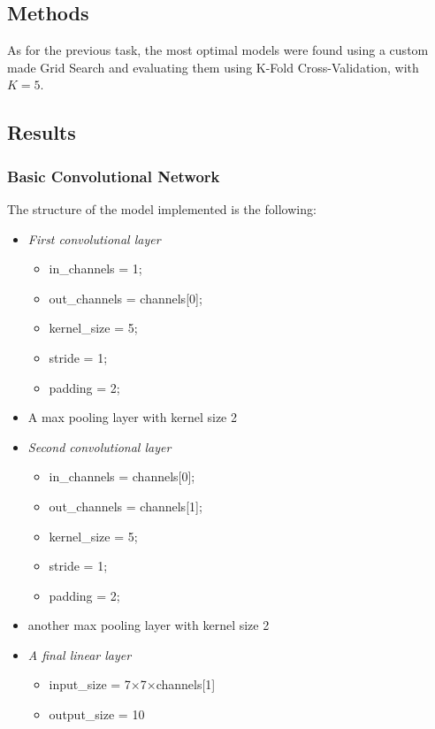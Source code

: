 \documentclass[11pt,a4paper,twocolumn]{IEEEtran}
\begin{document}
		\subsection{\textbf{Methods}}
			As for the previous task, the most optimal models were found using a custom made Grid Search and evaluating them using K-Fold Cross-Validation, with $K=5$.
			
			\subsection{\textbf{Results}}
			\subsubsection{Basic Convolutional Network}
			The structure of the model implemented is the following:
			\begin{itemize}
				\item \textit{First convolutional layer}
				\begin{itemize}
					\item in\_channels = 1;
					\item out\_channels = channels[0];
					\item kernel\_size = 5;
					\item stride = 1;
					\item padding = 2;
				\end{itemize} 
				\item A max pooling layer with kernel size 2
				\item \textit{Second convolutional layer}
				\begin{itemize}
					\item in\_channels = channels[0];
					\item out\_channels = channels[1];
					\item kernel\_size = 5;
					\item stride = 1;
					\item padding = 2;
				\end{itemize} 
				\item another max pooling layer with kernel size 2
				\item \textit{A final linear layer}
				\begin{itemize}
					\item input\_size = 7$\times$7$\times$channels[1]
					\item output\_size = 10
				\end{itemize}
			\end{itemize}
\end{document}
